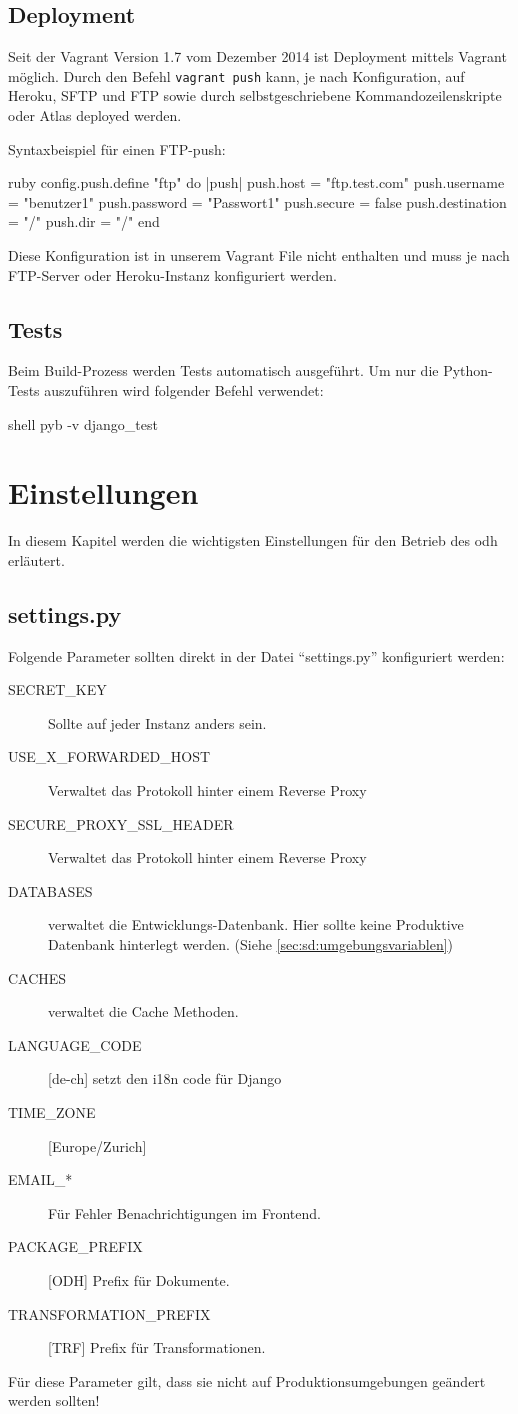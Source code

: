 \subsection{Deployment}
Seit der Vagrant Version 1.7 vom Dezember 2014 ist Deployment mittels Vagrant möglich. Durch den Befehl \texttt{vagrant push} kann, je nach Konfiguration, auf Heroku, SFTP und FTP sowie durch selbstgeschriebene Kommandozeilenskripte oder Atlas deployed werden.

Syntaxbeispiel für einen FTP-push: \cite{vagrant-deployment}
\begin{src}{ruby}
config.push.define "ftp" do |push|
  push.host = "ftp.test.com"
  push.username = "benutzer1"
  push.password = "Passwort1"
  push.secure = false
  push.destination = "/"
  push.dir = "/"
end
\end{src}
Diese Konfiguration ist in unserem Vagrant File nicht enthalten und muss je nach FTP-Server oder Heroku-Instanz konfiguriert werden.

\subsection{Tests}
Beim Build-Prozess werden Tests automatisch ausgeführt. Um nur die Python-Tests auszuführen wird folgender Befehl verwendet:
\begin{src}{shell}
pyb -v django_test
\end{src}
\section{Einstellungen}
In diesem Kapitel werden die wichtigsten Einstellungen für den Betrieb des \ac{odh} erläutert.
\subsection{settings.py}
Folgende Parameter sollten direkt in der Datei ``settings.py'' konfiguriert werden:
\begin{description}
\item[SECRET\_KEY] Sollte auf jeder Instanz anders sein.
\item[USE\_X\_FORWARDED\_HOST] Verwaltet das Protokoll hinter einem Reverse Proxy
\item[SECURE\_PROXY\_SSL\_HEADER] Verwaltet das Protokoll hinter einem Reverse Proxy
\item[DATABASES] verwaltet die Entwicklungs-Datenbank. Hier sollte keine Produktive Datenbank hinterlegt werden. (Siehe \cref{sec:sd:umgebungsvariablen})
\item[CACHES] verwaltet die Cache Methoden.
\item[LANGUAGE\_CODE]{[}de-ch{]} setzt den i18n code für Django
\item[TIME\_ZONE]{[}Europe/Zurich{]}

\item[EMAIL\_*] Für Fehler Benachrichtigungen im Frontend.
\item[PACKAGE\_PREFIX]{[}ODH{]} Prefix für Dokumente. 
\item[TRANSFORMATION\_PREFIX]{[}TRF{]} Prefix für Transformationen.
\end{description}
Für diese Parameter gilt, dass sie nicht auf Produktionsumgebungen geändert werden sollten!
